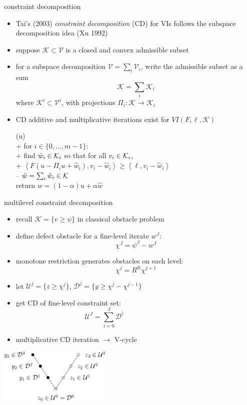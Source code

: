 \documentclass[svgnames,
               hyperref={colorlinks,citecolor=DeepPink4,linkcolor=FireBrick,urlcolor=Maroon},
               usepdftitle=false]  %
               {beamer}
\newcommand{\ip}[2]{\left<#1,#2\right>}
\begin{document}
\begin{frame}{constraint decomposition}

\begin{itemize}
\item Tai's (2003) \emph{constraint decomposition} (CD) for VIs follows the subspace decomposition idea (Xu 1992)
\item suppose $\mathcal{K} \subset \mathcal{V}$ is a closed and convex admissible subset
\item for a subspace decomposition $\mathcal{V} = \sum_i \mathcal{V}_i$, write the admissible subset as a sum
    $$\mathcal{K} = \sum_i \mathcal{K}_i$$
where $\mathcal{K}^i \subset \mathcal{V}^i$, with projections $\Pi_i : \mathcal{K} \to \mathcal{K}_i$
\item CD additive and multiplicative iterations exist for $VI(F,\ell,\mathcal{K})$

\begin{pseudo}
(u)\text{:} \\+
    for $i \in \{0,\dots,m-1\}$: \\+
        \rm{find} $\hat w_i\in \mathcal{K}_i$ \rm{so that for all} $v_i\in \mathcal{K}_i$, \\+
            $\boxed{\ip{F(u - \Pi_i u + \hat w_i)}{v_i-\hat w_i} \ge \ip{\ell}{v_i-\hat w_i}}$ \\--
    $\hat w = \sum_i \hat w_i\in\mathcal{K}$ \\
    return $w=(1-\alpha) u + \alpha \hat w$
\end{pseudo}
\end{itemize}
\end{frame}


\begin{frame}{multilevel constraint decomposition}

\begin{itemize}
\item recall $\mathcal{K} = \{v \ge \psi\}$ in classical obstacle problem
\item define \alert{defect obstacle} for a fine-level iterate $w^J$:
    $$\chi^J = \psi^J - w^J$$
\item \alert{monotone restriction} generates obstacles on each level:
	$$\chi^j = R^{\oplus} \chi^{j+1}$$
\item let $\mathcal{U}^j = \{z \ge \chi^j\}$, $\mathcal{D}^j = \{y \ge \chi^j - \chi^{j-1}\}$
\item get CD of fine-level constraint set:
	$$\mathcal{U}^J = \sum_{i=0}^J \mathcal{D}^i \phantom{KLDFJSKJDS SDF}$$
\item multiplicative CD iteration $\to$ V-cycle
\end{itemize}

\vspace{-25mm}
\hfill \includegraphics[width=0.4\textwidth]{images/fascd-vcycle.png}
\end{frame}
\end{document}
